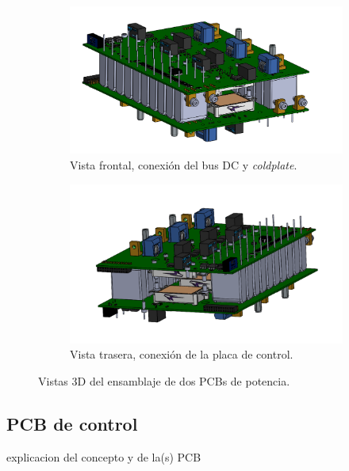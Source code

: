 \begin{figure}[H]
	\centering
	\begin{subfigure}{0.45\linewidth}
		\centering
		\includegraphics[width=\linewidth]{fig/invPower3}
		\caption{Vista frontal, conexión del bus DC y \textit{coldplate}.}
	\end{subfigure}
	\hspace{0.05\linewidth} %
	\begin{subfigure}{0.45\linewidth}
		\centering
		\includegraphics[width=\linewidth]{fig/invPower4}
		\caption{Vista trasera, conexión de la placa de control.}
	\end{subfigure}
	\caption{Vistas 3D del ensamblaje de dos PCBs de potencia.}
	
\end{figure}


\subsection{PCB de control}

explicacion del concepto y de la(s) PCB

